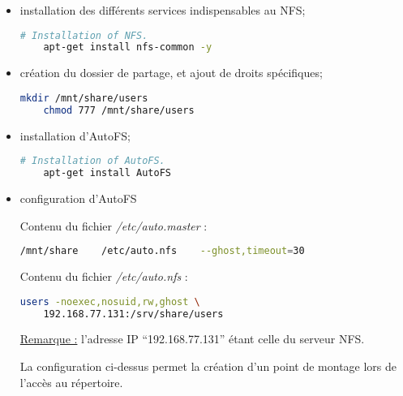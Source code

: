 \begin{itemize}
\item installation des différents services indispensables au NFS;

  \begin{lstlisting}[language=bash]
    # Installation of NFS.
    apt-get install nfs-common -y
  \end{lstlisting}

    \item création du dossier de partage, et ajout de droits
      spécifiques;

  \begin{lstlisting}[language=bash]
    mkdir /mnt/share/users
    chmod 777 /mnt/share/users
  \end{lstlisting}

\item installation d'AutoFS;

  \begin{lstlisting}[language=bash]
    # Installation of AutoFS.
    apt-get install AutoFS
  \end{lstlisting}

\item configuration d'AutoFS

  Contenu du fichier \textit{/etc/auto.master} :

  \begin{lstlisting}[language=bash]
    /mnt/share    /etc/auto.nfs    --ghost,timeout=30
  \end{lstlisting}

  Contenu du fichier \textit{/etc/auto.nfs} :

  \begin{lstlisting}[language=bash]
    users -noexec,nosuid,rw,ghost \
    192.168.77.131:/srv/share/users
  \end{lstlisting}

  \underline{Remarque :} l'adresse IP ``192.168.77.131'' étant celle du serveur NFS.

  La configuration ci-dessus permet la création d'un point de montage lors de
  l'accès au répertoire.
\end{itemize}

